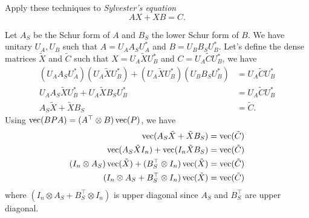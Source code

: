 Apply these techniques to \emph{Sylvester's equation}
\[
AX + XB = C.
\]

\begin{solution}
	Let $A_S$ be the Schur form of $A$ and $B_S$ the lower Schur
	form of $B$.
	We have unitary $U_A, U_B$ such that
	$A = U_AA_SU_A^*$ and $B = U_BB_SU_B^*$.
	Let's define the dense matrices $\tilde{X}$ and $\tilde{C}$ such that
	$X = U_A\tilde{X}U_B^*$ and $C = U_A\tilde{C}U_B^*$, we have
	\begin{align*}
	(U_AA_SU_A^*)(U_A\tilde{X}U_B^*) + (U_A\tilde{X}U_B^*)(U_BB_SU_B^*)
	& = U_A\tilde{C}U_B^*\\
	U_AA_S\tilde{X}U_B^* + U_A\tilde{X}B_SU_B^* & = U_A\tilde{C}U_B^*\\
	A_S\tilde{X} + \tilde{X}B_S & = \tilde{C}.
	\end{align*}
	Using $\operatorname{vec}(BPA) = (A^\top \otimes B) \operatorname{vec}(P)$, we have
	\begin{align*}
	\operatorname{vec}(A_S\tilde{X} + \tilde{X}B_S) & = \operatorname{vec}(\tilde{C})\\
	\operatorname{vec}(A_S\tilde{X}I_n) + \operatorname{vec}(I_n\tilde{X}B_S) & = \operatorname{vec}(\tilde{C})\\
	(I_n \otimes A_S) \operatorname{vec}(\tilde{X}) + (B_S^\top \otimes I_n) \operatorname{vec}(\tilde{X}) & = \operatorname{vec}(\tilde{C})\\
	(I_n \otimes A_S + B_S^\top \otimes I_n) \operatorname{vec}(\tilde{X}) & = \operatorname{vec}(\tilde{C})
	\end{align*}
	where $(I_n \otimes A_S + B_S^\top \otimes I_n)$ is upper diagonal
	since $A_S$ and $B_S^\top$ are upper diagonal.
\end{solution}